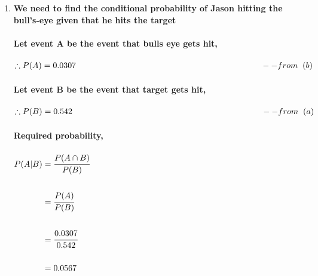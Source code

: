 \documentclass{article}
\begin{document}
\begin{enumerate}
\begin{enumerate}
\newpage
\item \large
\textbf{We need to find the conditional probability of Jason hitting the bull’s-eye given that he hits the target}\\\\
\textbf{Let event A be the event that bulls eye gets hit,}\\\\
$\begin{aligned}
\therefore P(A) = 0.0307 \hspace{7.8cm} --from \hspace{2mm} (b)
\end{aligned}$\\\\
\textbf{Let event B be the event that target gets hit,}\\\\
$\begin{aligned}
\therefore P(B) = 0.542 \hspace{8cm} --from \hspace{2mm} (a)
\end{aligned}$\\\\
\textbf{Required probability,}\\\\
$\begin{aligned}
P(A|B) &= \cfrac{P(A \cap B)}{P(B)}\\\\
&= \cfrac{P(A)}{P(B)}\\\\
&= \cfrac{0.0307}{0.542}\\\\
&= 0.0567
\end{aligned}$
\end{enumerate}


\end{enumerate}
\end{document}
